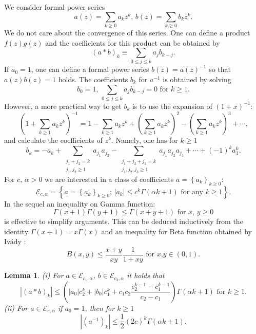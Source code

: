 \documentclass[a4paper]{article}%
\newtheorem{lemma}{Lemma}
\begin{document}
We consider formal power series%
\[
a\left(  z\right)  =\sum_{k\geq0}a_{k}z^{k}\text{, \ \ }b\left(  z\right)
=\sum_{k\geq0}b_{k}z^{k}\text{.}%
\]
We do not care about the convergence of this series. One can define a product
$f(z)g(z)$ and the coefficients for this product can be obtained by%
\begin{equation}
\left(  a\ast b\right)  _{k}\equiv\sum_{0\leq j\leq k}a_{j}b_{k-j}\text{.}
\label{a6}%
\end{equation}
If $a_{0}=1$, one can define a formal power series $b(z)=a\left(  z\right)
^{-1}$ so that $a(z)b(z)=1$ holds. The coefficients $b_{k}$ for $a^{-1}$ is
obtained by solving%
\[
b_{0}=1\text{, \ \ }\sum_{0\leq j\leq k}a_{j}b_{k-j}=0\text{ \ for }%
k\geq1\text{.}%
\]
However, a more practical way to get $b_{k}$ is to use the expansion of
$\left(  1+x\right)  ^{-1}$:%
\[
\left(  1+\sum_{k\geq1}a_{k}z^{k}\right)  ^{-1}=1-\sum_{k\geq1}a_{k}%
z^{k}+\left(  \sum_{k\geq1}a_{k}z^{k}\right)  ^{2}-\left(  \sum_{k\geq1}%
a_{k}z^{k}\right)  ^{3}+\cdots\text{,}%
\]
and calculate the coefficients of $z^{k}$. Namely, one has for $k\geq1$%
\begin{equation}
b_{k}=-a_{k}+\sum_{\substack{j_{1}+j_{2}=k\\j_{1},j_{2}\geq1}}a_{j_{1}%
}a_{j_{2}}-\sum_{\substack{j_{1}+j_{2}+j_{3}=k\\j_{1},j_{2},j_{3}\geq
1}}a_{j_{1}}a_{j_{2}}a_{j_{3}}+\cdots+\left(  -1\right)  ^{k}a_{1}^{k}\text{.}
\label{a7}%
\end{equation}
For $c$, $\alpha>0$ we are interested in a class of coefficients $a=\left\{
a_{k}\right\}  _{k\geq0}$:
\[
\mathcal{E}_{c,\alpha}=\left\{  a=\left\{  a_{k}\right\}  _{k\geq0}\text{;
\ }\left\vert a_{k}\right\vert \leq c^{k}\Gamma\left(  \alpha k+1\right)
\text{ for any }k\geq1\right\}  \text{.}%
\]
In the sequel an inequality on Gamma function:%
\begin{equation}
\Gamma\left(  x+1\right)  \Gamma\left(  y+1\right)  \leq\Gamma\left(
x+y+1\right)  \text{ \ for }x\text{, }y\geq0 \label{a8}%
\end{equation}
is effective to simplify arguments. This can be deduced inductively from the
identity $\Gamma\left(  x+1\right)  =x\Gamma\left(  x\right)  $ and an
inequality for Beta function obtained by Iv\'{a}dy \cite{i}:%
\[
B\left(  x,y\right)  \leq\dfrac{x+y}{xy}\dfrac{1}{1+xy}\text{ \ for }x\text{,
}y\in\left(  0,1\right)  \text{.}%
\]


\begin{lemma}
\label{a-2}(i) For $a\in\mathcal{E}_{c_{1},\alpha}$, $b\in\mathcal{E}%
_{c_{2},\alpha}$ it holds that%
\[
\left\vert \left(  a\ast b\right)  _{k}\right\vert \leq\left(  \left\vert
a_{0}\right\vert c_{2}^{k}+\left\vert b_{0}\right\vert c_{1}^{k}+c_{1}%
c_{2}\dfrac{c_{2}^{k-1}-c_{1}^{k-1}}{c_{2}-c_{1}}\right)  \Gamma\left(  \alpha
k+1\right)  \text{ \ for }k\geq1\text{.}%
\]
(ii) For $a\in\mathcal{E}_{c,\alpha}$ if $a_{0}=1$, then for $k\geq1$%
\[
\left\vert \left(  a^{-1}\right)  _{k}\right\vert \leq\dfrac{1}{2}\left(
2c\right)  ^{k}\Gamma\left(  \alpha k+1\right)  \text{.}%
\]

\end{lemma}
\end{document}

